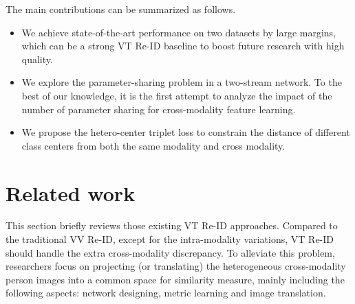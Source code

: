 \documentclass[journal]{IEEEtran}
\begin{document}
The main contributions can be summarized as follows.
\begin{itemize}
\item We achieve state-of-the-art performance on two datasets by large margins, which can be a strong VT Re-ID baseline to boost future research with high quality.
\item We explore the parameter-sharing problem in a two-stream network. To the best of our knowledge, it is the first attempt to analyze the impact of the number of parameter sharing for cross-modality feature learning.
\item We propose the hetero-center triplet loss to constrain the distance of different class centers from both the same modality and cross modality.
\end{itemize}



\section{Related work}
\label{sec:relatedwork}
This section briefly reviews those existing VT Re-ID approaches. Compared to the traditional VV Re-ID, except for the intra-modality variations, VT Re-ID should handle the extra cross-modality discrepancy. To alleviate this problem, researchers focus on projecting (or translating) the heterogeneous cross-modality person images into a common space for similarity measure, mainly including the following aspects: network designing, metric learning and image translation.
\end{document}

